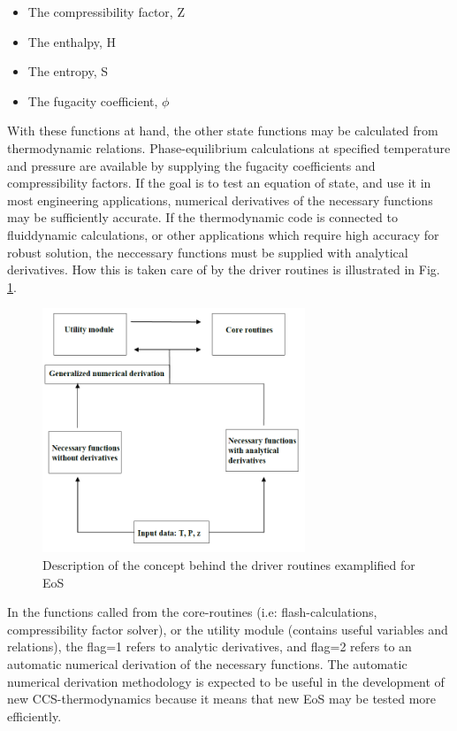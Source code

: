 \documentclass[a4paper, 12pt, english, sintefheadings, sintefcolour]{sintefmemo}
\begin{document}
\begin{itemize}
\item The compressibility factor, Z
\item The enthalpy, H
\item The entropy, S
\item The fugacity coefficient, $\phi$
\end{itemize}

With these functions at hand, the other state functions may be calculated from
thermodynamic relations. Phase-equilibrium calculations at specified
temperature and pressure are available by supplying the fugacity coefficients
and compressibility factors. If the goal is to test an equation of state, and
use it in most engineering applications, numerical derivatives of the
necessary functions may be sufficiently accurate. If the thermodynamic code is
connected to fluiddynamic calculations, or other applications which require
high accuracy for robust solution, the neccessary functions must be supplied
with analytical derivatives. How this is taken care of by the driver routines
is illustrated in Fig. \ref{fig:Driver}.

\begin{figure}[Htb]
\centering
\includegraphics[width=0.70\textwidth]{driver_routines.png}
\caption{Description of the concept behind the driver routines examplified for EoS}
\label{fig:Driver}
\end{figure}   


In the functions called from the core-routines (i.e: flash-calculations,
compressibility factor solver), or the utility module (contains useful
variables and relations), the flag=1 refers to analytic derivatives, and
flag=2 refers to an automatic numerical derivation of the necessary
functions. The automatic numerical derivation methodology is expected to be
useful in the development of new CCS-thermodynamics because it means that new
EoS may be tested more efficiently.
\end{document}

